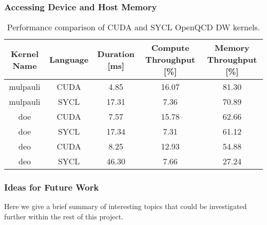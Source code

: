 \subsubsection{Accessing Device and Host Memory}\label{sec:openqcd_memoryaccess}


\begin{center}
	\begin{table}
		\begin{tabular}{||c c c c c||}
			\hline
			Kernel Name & Language & Duration [ms] & Compute Throughput [\%] & Memory Throughput [\%] \\
			\hline\hline
			mulpauli    & CUDA     & 4.85          & 16.07                   & 81.30                  \\
			\hline
			mulpauli    & SYCL     & 17.31         & 7.36                    & 70.89                  \\
			\hline
			doe         & CUDA     & 7.57          & 15.78                   & 62.66                  \\
			\hline
			doe         & SYCL     & 17.34         & 7.31                    & 61.12                  \\
			\hline
			deo         & CUDA     & 8.25          & 12.93                   & 54.88                  \\
			\hline
			deo         & SYCL     & 46.30         & 7.66                    & 27.24                  \\
			\hline
		\end{tabular}
		\caption{\label{tab:openqcd_perf}Performance comparison of CUDA and SYCL OpenQCD DW kernels.}
	\end{table}
\end{center}


\subsubsection{Ideas for Future Work}\label{sec:openqcd_future_work}

Here we give a brief summary of interesting topics that could be investigated further within the rest of this project.

